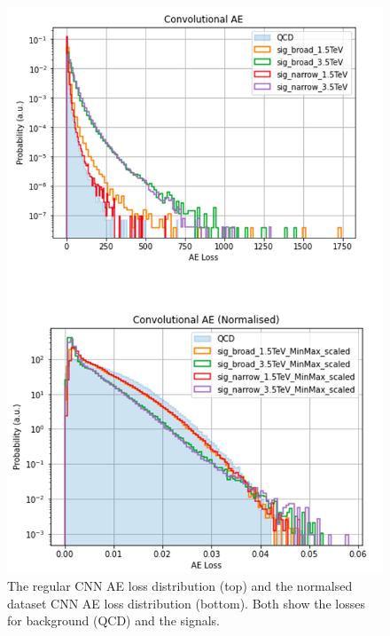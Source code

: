 \documentclass[a4paper]{article}
\theoremstyle{plain}
\theoremstyle{definition}
\begin{document}
            \begin{figure}[H]
                \centering
                    \begin{minipage}[c]{0.45\linewidth}
                        \centering
                        \includegraphics[width=\textwidth]{cnn-loss.png}
                        \caption{The regular CNN AE loss distribution (top) and the normalsed dataset CNN AE loss distribution (bottom). Both show the losses for background (QCD) and the signals.}
                        \label{fig:cnn-loss}
                    \end{minipage}
                    \hfill
                    \begin{minipage}[c]{0.45\linewidth}
                        \centering

\end{minipage}
\end{figure}
\end{document}
